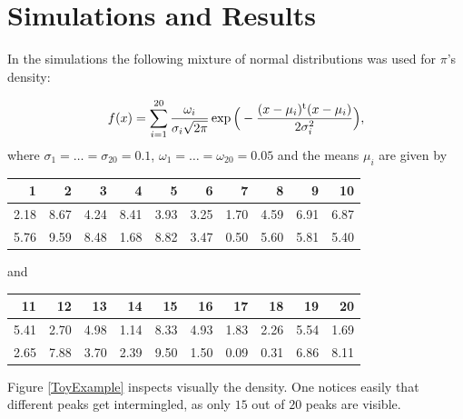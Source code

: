 \chapter{ Simulations and Results }

In the simulations the following mixture of normal distributions was used for $\pi$'s density:

\begin{equation}\label{experimental pi}
f(x) = 
\sum_{i=1}^{20} \frac{\omega_i}{ \sigma_i \sqrt{2 \pi} } \exp \Big( -\frac{(x - \mu_i)^{\mathrm{t}} (x - \mu_i)}{2 \sigma_i^2} \Big),	
\end{equation}
where $\sigma_1 = \dots = \sigma_{20} = 0.1$, $\omega_1 = \dots = \omega_{20} = 0.05 $ and the means $\mu_i$ are given by

\begin{table}[ht]
	\centering
\begin{tabular}{rrrrrrrrrr}
  \hline
1 & 2 & 3 & 4 & 5 & 6 & 7 & 8 & 9 & 10 \\ 
  \hline
2.18 & 8.67 & 4.24 & 8.41 & 3.93 & 3.25 & 1.70 & 4.59 & 6.91 & 6.87 \\ 
  5.76 & 9.59 & 8.48 & 1.68 & 8.82 & 3.47 & 0.50 & 5.60 & 5.81 & 5.40 \\ 
   \hline
\end{tabular}
\end{table}
and 

\begin{table}[ht]
	\centering
\begin{tabular}{rrrrrrrrrr}
  \hline
11 & 12 & 13 & 14 & 15 & 16 & 17 & 18 & 19 & 20 \\ 
  \hline
5.41 & 2.70 & 4.98 & 1.14 & 8.33 & 4.93 & 1.83 & 2.26 & 5.54 & 1.69 \\ 
  2.65 & 7.88 & 3.70 & 2.39 & 9.50 & 1.50 & 0.09 & 0.31 & 6.86 & 8.11 \\ 
   \hline
\end{tabular}
\end{table}
 
Figure \ref{ToyExample} inspects visually the density. One notices easily that different peaks get intermingled, as only $15$ out of $20$ peaks are visible.  

